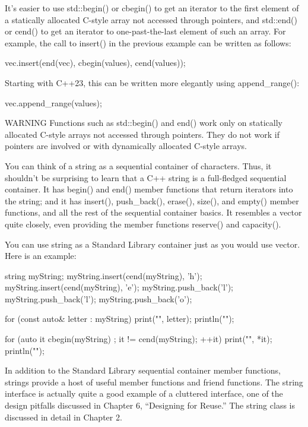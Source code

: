 It’s easier to use std::begin() or cbegin() to get an iterator to the first element of a statically allocated C-style array not accessed through pointers, and std::end() or cend() to get an iterator to one-past-the-last element of such an array. For example, the call to insert() in the previous example can be written as follows:

\begin{cpp}
vec.insert(end(vec), cbegin(values), cend(values));
\end{cpp}

Starting with C++23, this can be written more elegantly using append\_range():

\begin{cpp}
vec.append_range(values);
\end{cpp}

\begin{myWarning}{WARNING}
Functions such as std::begin() and end() work only on statically allocated C-style arrays not accessed through pointers. They do not work if pointers are involved or with dynamically allocated C-style arrays.
\end{myWarning}


You can think of a string as a sequential container of characters. Thus, it shouldn’t be surprising to learn that a C++ string is a full-fledged sequential container. It has begin() and end() member functions that return iterators into the string; and it has insert(), push\_back(), erase(), size(), and empty() member functions, and all the rest of the sequential container basics. It resembles a vector quite closely, even providing the member functions reserve() and capacity().

You can use string as a Standard Library container just as you would use vector. Here is an example:

\begin{cpp}
string myString;
myString.insert(cend(myString), 'h');
myString.insert(cend(myString), 'e');
myString.push_back('l');
myString.push_back('l');
myString.push_back('o');

for (const auto& letter : myString) {
    print("{}", letter);
}
println("");

for (auto it { cbegin(myString) }; it != cend(myString); ++it) {
    print("{}", *it);
}
println("");
\end{cpp}

In addition to the Standard Library sequential container member functions, strings provide a host of useful member functions and friend functions. The string interface is actually quite a good example of a cluttered interface, one of the design pitfalls discussed in Chapter 6, “Designing for Reuse.” The string class is discussed in detail in Chapter 2.

